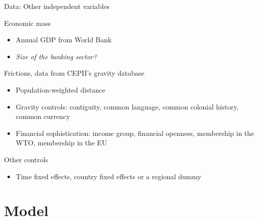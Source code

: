 \documentclass{beamer}
\begin{document}
\begin{frame}{Data: Other independent variables}
\begin{block}{Economic mass}
\begin{itemize}
\item Annual GDP from World Bank
\item \textit{Size of the banking sector?}
\end{itemize}
\end{block}
\begin{block}{Frictions, data from CEPII's gravity database}
\begin{itemize}
\item Population-weighted distance
\item Gravity controls: contiguity, common language, common colonial history, common currency
\item Financial sophistication: income group, financial openness, membership in the WTO, membership in the EU
\end{itemize}
\end{block}
\begin{block}{Other controls}
\begin{itemize}
\item Time fixed effects, country fixed effects or a regional dummy
\end{itemize}
\end{block}
\end{frame}

\section{Model}

\end{document}
